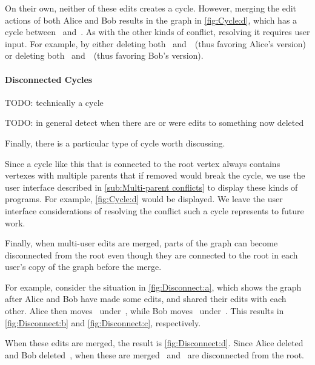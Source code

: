 On their own, neither of these edits creates a cycle.
However, merging the edit actions of both Alice and Bob results in the graph
in \autoref{fig:Cycle:d}, which has a cycle
between~\vMultiCycleTimes{} and~\vMultiCyclePlus{}.
As with the other kinds of conflict, resolving it requires user input.
For example, by either deleting both~\eMultiCycleBobPlus{} and~\eMultiCycleBobTimes{}~(thus favoring Alice's version)
or deleting both~\eMultiCycleAliceTimes{} and~\eMultiCycleAlicePlus{}~(thus favoring Bob's version).

\paragraph{Disconnected Cycles}

\figureDisconnect{}

TODO: technically a cycle

TODO: in general detect when there are or were edits to something now deleted


Finally, there is a particular type of cycle worth discussing.

Since a cycle like this that is connected to the root vertex always
contains vertexes with multiple parents that if removed would break the cycle,
we use the user interface described in \autoref{sub:Multi-parent conflicts}
to display these kinds of programs.
For example, \autoref{fig:Cycle:d} would be displayed.
We leave the user interface considerations of resolving the conflict such a
cycle represents to future work.

Finally, when multi-user edits are merged,
parts of the graph can become disconnected from the root
even though they are connected to the root in each user's
copy of the graph before the merge.

For example, consider the situation in \autoref{fig:Disconnect:a},
which shows the graph after Alice and Bob have made some edits,
and shared their edits with each other.
Alice then moves~\vMultiCycleTimes{} under~\vSimpleTimes{},
while Bob moves~\vSimpleTimes{} under~\vMultiCycleTimes{}.
This results in \autoref{fig:Disconnect:b} and \autoref{fig:Disconnect:c}, respectively.

When these edits are merged, the result is \autoref{fig:Disconnect:d}.
Since Alice deleted~\eNestedPartsBob{}
and Bob deleted~\eMultiCycleAliceTimes{},
when these are merged~\vMultiCycleTimes{} and~\vSimpleTimes{}
are disconnected from the root.

